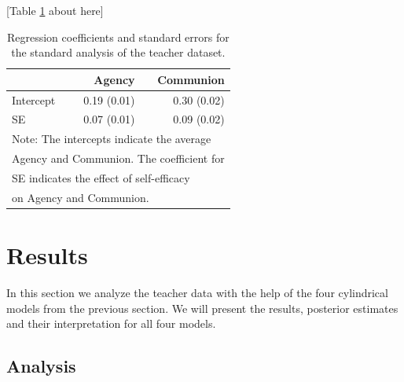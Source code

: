 \documentclass[man,mask]{apa6}
\begin{document}
\hfil [Table \ref{Tableteacherstandardanalysis} about here] \hfil

\begin{table}[h]
\centering
\caption{Regression coefficients and standard errors for the standard analysis of the teacher dataset.} 
\begin{tabular}{lrr}
  \noalign{\smallskip}\hline\noalign{\smallskip}
  & Agency & Communion \\\hline\noalign{\smallskip}
Intercept & 0.19 (0.01) & 0.30 (0.02) \\
SE & 0.07 (0.01) & 0.09 (0.02) \\ \hline
\multicolumn{3}{l}{Note: The intercepts indicate the average }\\
\multicolumn{3}{l}{Agency and Communion. The coefficient for }\\
\multicolumn{3}{l}{SE indicates the effect of self-efficacy }\\
\multicolumn{3}{l}{on Agency and Communion.}
\end{tabular}
\label{Tableteacherstandardanalysis}
\end{table}

\section{Results}\label{DataAnalysis}

In this section we analyze the teacher data with the help of the four
cylindrical models from the previous section. We will present the results,
posterior estimates and their interpretation for all four models.

\subsection{Analysis}\label{DataResults}
\end{document}
